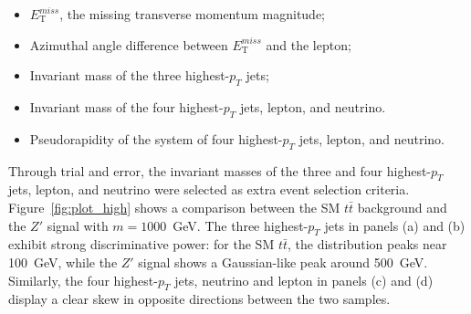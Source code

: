 \begin{itemize}
    \item \(E_{\text{T}}^{miss}\), the missing transverse momentum magnitude;
    \item Azimuthal angle difference between \(E_{\text{T}}^{miss}\) and the lepton;
    \item Invariant mass of the three highest-\(p_T\) jets;
    \item Invariant mass of the four highest-\(p_T\) jets, lepton, and neutrino.
    \item Pseudorapidity of the system of four highest-\(p_T\) jets, lepton, and neutrino.
\end{itemize}

    Through trial and error, the invariant masses of the three and four highest-\(p_T\) jets, lepton, and neutrino were selected as extra event selection criteria. Figure~\ref{fig:plot_high} shows a comparison between the SM \(t\bar{t}\) background and the \(Z'\) signal with \(m = 1000\)~GeV. The three highest-\(p_T\) jets in panels (a) and (b) exhibit strong discriminative power: for the SM \(t\bar{t}\), the distribution peaks near 100~GeV, while the \(Z'\) signal shows a Gaussian-like peak around 500~GeV. Similarly, the four highest-\(p_T\) jets, neutrino and lepton in panels (c) and (d) display a clear skew in opposite directions between the two samples.



